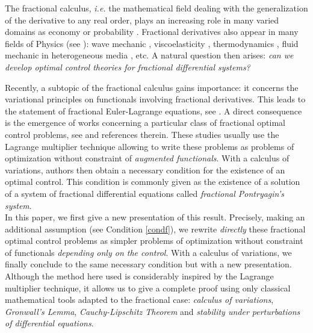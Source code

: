 \documentclass[english,11pt,reqno]{smfart}
\begin{document}
The fractional calculus, \textit{i.e.} the mathematical field dealing with the generalization of the derivative to any real order, plays an increasing role in many varied domains as economy \cite{comt} or probability \cite{levy,stan}. Fractional derivatives also appear in many fields of Physics (see \cite{hilf3}):  wave mechanic \cite{alme}, viscoelasticity \cite{bagl}, thermodynamics \cite{hilf2}, fluid mechanic in heterogeneous media \cite{hilf,neel,neel2}, etc. A natural question then arises: \textit{can we develop optimal control theories for fractional differential systems?}

Recently, a subtopic of the fractional calculus gains importance: it concerns the variational principles on functionals involving fractional derivatives. This leads to the statement of fractional Euler-Lagrange equations, see \cite{agra,bale2,riew}. A direct consequence is the emergence of works concerning a particular class of fractional optimal control problems, see \cite{agra2,agra3,torr,torr2,jeli} and references therein. These studies usually use the Lagrange multiplier technique allowing to write these problems as problems of optimization without constraint of \textit{augmented functionals}. With a calculus of variations, authors then obtain a necessary condition for the existence of an optimal control. This condition is commonly given as the existence of a solution of a system of fractional differential equations called \textit{fractional Pontryagin's system}. \\

In this paper, we first give a new presentation of this result. Precisely, making an additional assumption (see Condition \eqref{condf}), we rewrite \textit{directly} these fractional optimal control problems as simpler problems of optimization without constraint of functionals \textit{depending only on the control}. With a calculus of variations, we finally conclude to the same necessary condition but with a new presentation. Although the method here used is considerably inspired by the Lagrange multiplier technique, it allows us to give a complete proof using only classical mathematical tools adapted to the fractional case: \textit{calculus of variations}, \textit{Gronwall's Lemma}, \textit{Cauchy-Lipschitz Theorem} and \textit{stability under perturbations of differential equations}. 
\end{document}
